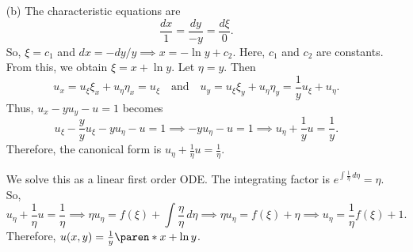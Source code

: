 \documentclass[11pt]{penrose}
\begin{document}
\begin{problem}{1}
\begin{enumerate}
        \item[(b)] The characteristic equations are
        \begin{equation*}
            \frac{dx}{1} = \frac{dy}{-y} = \frac{d\xi}{0}.
        \end{equation*}
        So, $\xi = c_1$ and $dx = -dy/y \implies x = -\ln y + c_2$. Here, $c_1$ and $c_2$ are constants. From this, we obtain $\xi = x + \ln y$. Let $\eta = y$. Then
        \begin{equation*}
            u_x = u_\xi \xi_x + u_\eta \eta_x = u_\xi
            \quad\text{and}\quad
            u_y = u_\xi \xi_y + u_\eta \eta_y = \frac{1}{y} u_\xi + u_\eta.
        \end{equation*}
        Thus, $u_x - y u_y - u = 1$ becomes
        \begin{equation*}
            u_\xi - \frac{y}{y} u_\xi - y u_\eta - u = 1
            \implies
            - y u_\eta - u = 1
            \implies
            u_\eta + \frac{1}{y}u = \frac{1}{y}.
        \end{equation*}
        Therefore, the canonical form is $u_\eta + \frac{1}{\eta}u = \frac{1}{\eta}$.

        We solve this as a linear first order ODE. The integrating factor is $e^{\int \frac{1}{\eta} \,d\eta} = \eta$. So,
        \begin{equation*}
            u_\eta + \frac{1}{\eta}u = \frac{1}{\eta}
            \implies
            \eta u_\eta = f(\xi) + \int \frac{\eta}{\eta} \,d\eta
            \implies
            \eta u_\eta = f(\xi) + \eta
            \implies
            u_\eta = \frac{1}{\eta}f(\xi) + 1.
        \end{equation*}
        Therefore, $u(x,y) = \frac{1}{y} \paren*{x + \ln y}$.
    \end{enumerate}
\end{problem}
\end{document}
